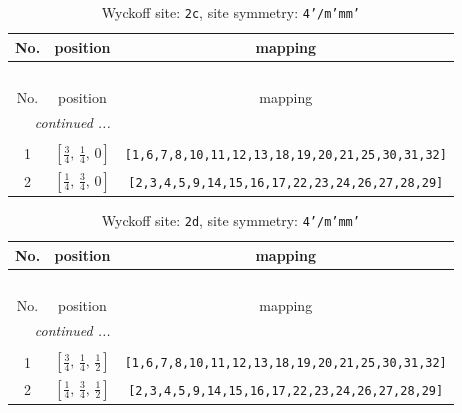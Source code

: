 \documentclass[fleqn,8pt]{jsarticle}
\begin{document}
\renewcommand{\arraystretch}{1.2}
\begin{longtable}{ccc}
\caption{Wyckoff site: {\tt 2c}, site symmetry: {\tt 4'/m'mm'}}
 \\
 \hline \hline
No. & position & mapping \\ \hline \endfirsthead

\multicolumn{2}{l}{\tablename\ \thetable{}} \\
 \hline \hline
No. & position & mapping \\ \hline \endhead

 \hline \hline
\multicolumn{2}{r}{\footnotesize\it continued ...} \\ \endfoot

 \hline \hline
\multicolumn{2}{r}{} \\ \endlastfoot

1 & $\left[ \frac{3}{4},\, \frac{1}{4},\, 0 \right]$ & {\tt [1,6,7,8,10,11,12,13,18,19,20,21,25,30,31,32]} \\ \hline
2 & $\left[ \frac{1}{4},\, \frac{3}{4},\, 0 \right]$ & {\tt [2,3,4,5,9,14,15,16,17,22,23,24,26,27,28,29]} \\
\end{longtable}
\renewcommand{\arraystretch}{1.2}
\begin{longtable}{ccc}
\caption{Wyckoff site: {\tt 2d}, site symmetry: {\tt 4'/m'mm'}}
 \\
 \hline \hline
No. & position & mapping \\ \hline \endfirsthead

\multicolumn{2}{l}{\tablename\ \thetable{}} \\
 \hline \hline
No. & position & mapping \\ \hline \endhead

 \hline \hline
\multicolumn{2}{r}{\footnotesize\it continued ...} \\ \endfoot

 \hline \hline
\multicolumn{2}{r}{} \\ \endlastfoot

1 & $\left[ \frac{3}{4},\, \frac{1}{4},\, \frac{1}{2} \right]$ & {\tt [1,6,7,8,10,11,12,13,18,19,20,21,25,30,31,32]} \\ \hline
2 & $\left[ \frac{1}{4},\, \frac{3}{4},\, \frac{1}{2} \right]$ & {\tt [2,3,4,5,9,14,15,16,17,22,23,24,26,27,28,29]} \\
\end{longtable}
\renewcommand{\arraystretch}{1.2}
\end{document}

